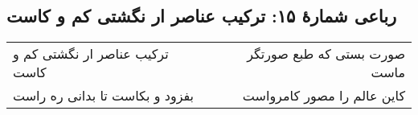 \begin{center}
\section*{رباعی شمارهٔ ۱۵: ترکیب عناصر ار نگشتی کم و کاست}
\label{sec:015}
\begin{longtable}{l p{0.5cm} r}
ترکیب عناصر ار نگشتی کم و کاست
&&
صورت بستی که طبع صورتگر ماست
\\
بفزود و بکاست تا بدانی ره راست
&&
کاین عالم را مصور کامرواست
\\
\end{longtable}
\end{center}
